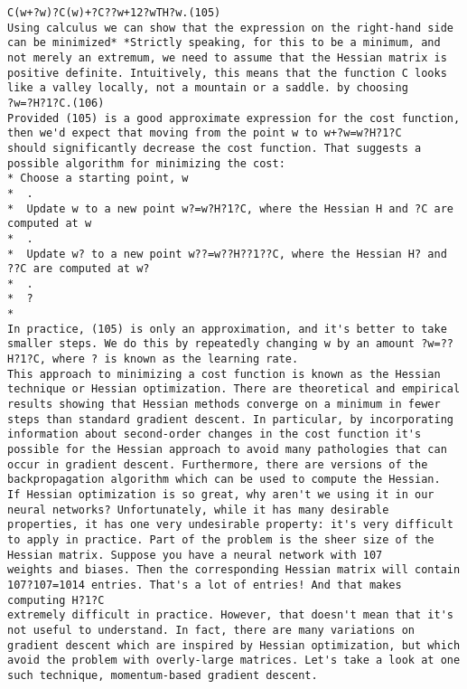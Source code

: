 \begin{lstlisting}
C(w+?w)?C(w)+?C??w+12?wTH?w.(105)
Using calculus we can show that the expression on the right-hand side can be minimized* *Strictly speaking, for this to be a minimum, and not merely an extremum, we need to assume that the Hessian matrix is positive definite. Intuitively, this means that the function C looks like a valley locally, not a mountain or a saddle. by choosing 
?w=?H?1?C.(106)
Provided (105) is a good approximate expression for the cost function, then we'd expect that moving from the point w to w+?w=w?H?1?C
should significantly decrease the cost function. That suggests a possible algorithm for minimizing the cost:
* Choose a starting point, w
*  .
*  Update w to a new point w?=w?H?1?C, where the Hessian H and ?C are computed at w
*  .
*  Update w? to a new point w??=w??H??1??C, where the Hessian H? and ??C are computed at w?
*  .
*  ?
* 
In practice, (105) is only an approximation, and it's better to take smaller steps. We do this by repeatedly changing w by an amount ?w=??H?1?C, where ? is known as the learning rate.
This approach to minimizing a cost function is known as the Hessian technique or Hessian optimization. There are theoretical and empirical results showing that Hessian methods converge on a minimum in fewer steps than standard gradient descent. In particular, by incorporating information about second-order changes in the cost function it's possible for the Hessian approach to avoid many pathologies that can occur in gradient descent. Furthermore, there are versions of the backpropagation algorithm which can be used to compute the Hessian.
If Hessian optimization is so great, why aren't we using it in our neural networks? Unfortunately, while it has many desirable properties, it has one very undesirable property: it's very difficult to apply in practice. Part of the problem is the sheer size of the Hessian matrix. Suppose you have a neural network with 107
weights and biases. Then the corresponding Hessian matrix will contain 107?107=1014 entries. That's a lot of entries! And that makes computing H?1?C
extremely difficult in practice. However, that doesn't mean that it's not useful to understand. In fact, there are many variations on gradient descent which are inspired by Hessian optimization, but which avoid the problem with overly-large matrices. Let's take a look at one such technique, momentum-based gradient descent.

\end{lstlisting}
